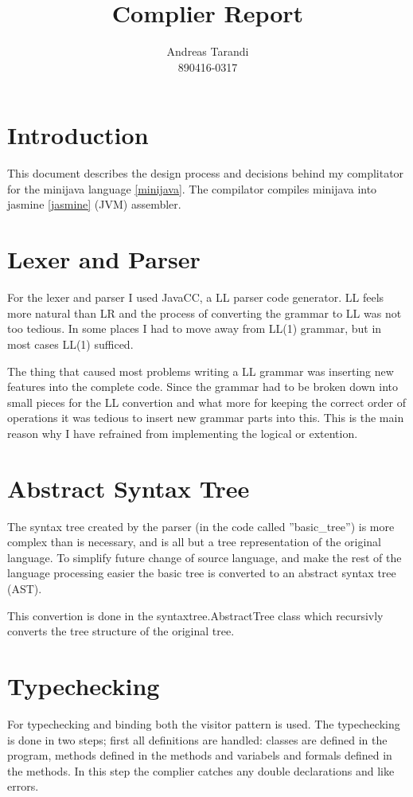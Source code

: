 \documentclass[a4paper,11pt]{article}
\author{Andreas Tarandi\\890416-0317}
\title{Complier Report}
\begin{document}
   \maketitle

   \section{Introduction}
   This document describes the design process and decisions behind my complitator for the minijava language \ref{minijava}. The compilator compiles minijava into jasmine \ref{jasmine} (JVM) assembler.

   \section{Lexer and Parser}
   For the lexer and parser I used JavaCC, a LL parser code generator. LL feels more natural than LR and the 
   process of converting the grammar to LL was not too tedious. In some places I had to move away from LL(1) grammar, but in most cases LL(1) sufficed.

   The thing that caused most problems writing a LL grammar was inserting new features into the complete code. Since the grammar had to be broken down into small pieces for 
   the LL convertion and what more for keeping the correct order of operations it was tedious to insert new grammar parts into this. This is the main reason why I have refrained from
   implementing the logical or extention.

   \section{Abstract Syntax Tree}
   The syntax tree created by the parser (in the code called ''basic\_tree'') is more complex than
   is necessary, and is all but a tree representation of the original language. To simplify future change of source language, and make the rest of the language processing easier the basic tree is
   converted to an abstract syntax tree (AST).

   This convertion is done in the syntaxtree.AbstractTree class which recursivly converts the tree structure of the original tree.

   \section{Typechecking}

   For typechecking and binding both the visitor pattern is used. The typechecking is done in two steps; first all definitions are handled: 
   classes are defined in the program, methods defined in the methods and variabels and formals defined in the methods. In this step the complier catches any
   double declarations and like errors.
\end{document}
